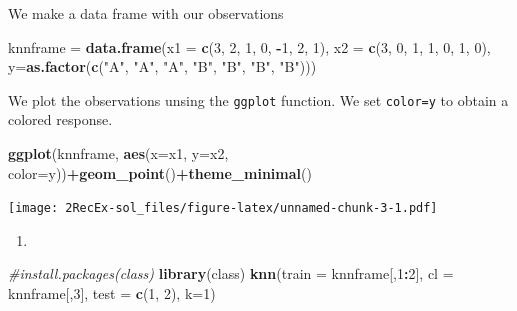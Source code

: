 \documentclass[]{article}
\newenvironment{Shaded}{\begin{snugshade}}{\end{snugshade}}
\newcommand{\KeywordTok}[1]{\textcolor[rgb]{0.13,0.29,0.53}{\textbf{#1}}}
\newcommand{\DataTypeTok}[1]{\textcolor[rgb]{0.13,0.29,0.53}{#1}}
\newcommand{\DecValTok}[1]{\textcolor[rgb]{0.00,0.00,0.81}{#1}}
\newcommand{\StringTok}[1]{\textcolor[rgb]{0.31,0.60,0.02}{#1}}
\newcommand{\CommentTok}[1]{\textcolor[rgb]{0.56,0.35,0.01}{\textit{#1}}}
\newcommand{\OperatorTok}[1]{\textcolor[rgb]{0.81,0.36,0.00}{\textbf{#1}}}
\newcommand{\NormalTok}[1]{#1}
\begin{document}
We make a data frame with our observations

\begin{Shaded}
\begin{Highlighting}[]
\NormalTok{knnframe =}\StringTok{ }\KeywordTok{data.frame}\NormalTok{(}\DataTypeTok{x1 =} \KeywordTok{c}\NormalTok{(}\DecValTok{3}\NormalTok{, }\DecValTok{2}\NormalTok{, }\DecValTok{1}\NormalTok{, }\DecValTok{0}\NormalTok{, }\OperatorTok{-}\DecValTok{1}\NormalTok{, }\DecValTok{2}\NormalTok{, }\DecValTok{1}\NormalTok{), }\DataTypeTok{x2 =} \KeywordTok{c}\NormalTok{(}\DecValTok{3}\NormalTok{, }\DecValTok{0}\NormalTok{, }\DecValTok{1}\NormalTok{, }\DecValTok{1}\NormalTok{, }\DecValTok{0}\NormalTok{, }\DecValTok{1}\NormalTok{, }\DecValTok{0}\NormalTok{),  }\DataTypeTok{y=}\KeywordTok{as.factor}\NormalTok{(}\KeywordTok{c}\NormalTok{(}\StringTok{"A"}\NormalTok{, }\StringTok{"A"}\NormalTok{, }\StringTok{"A"}\NormalTok{, }\StringTok{"B"}\NormalTok{, }\StringTok{"B"}\NormalTok{, }\StringTok{"B"}\NormalTok{, }\StringTok{"B"}\NormalTok{)))}
\end{Highlighting}
\end{Shaded}

We plot the observations unsing the \texttt{ggplot} function. We set
\texttt{color=y} to obtain a colored response.

\begin{Shaded}
\begin{Highlighting}[]
\KeywordTok{ggplot}\NormalTok{(knnframe, }\KeywordTok{aes}\NormalTok{(}\DataTypeTok{x=}\NormalTok{x1, }\DataTypeTok{y=}\NormalTok{x2, }\DataTypeTok{color=}\NormalTok{y))}\OperatorTok{+}\KeywordTok{geom_point}\NormalTok{()}\OperatorTok{+}\KeywordTok{theme_minimal}\NormalTok{()}
\end{Highlighting}
\end{Shaded}

\texttt{[image: 2RecEx-sol\_files/figure-latex/unnamed-chunk-3-1.pdf]}

\begin{enumerate}
\def\labelenumi{\alph{enumi}.}
\setcounter{enumi}{5}
\item
\end{enumerate}

\begin{Shaded}
\begin{Highlighting}[]
\CommentTok{#install.packages(class)}
\KeywordTok{library}\NormalTok{(class)}
\KeywordTok{knn}\NormalTok{(}\DataTypeTok{train =}\NormalTok{ knnframe[,}\DecValTok{1}\OperatorTok{:}\DecValTok{2}\NormalTok{], }\DataTypeTok{cl =}\NormalTok{ knnframe[,}\DecValTok{3}\NormalTok{], }\DataTypeTok{test =} \KeywordTok{c}\NormalTok{(}\DecValTok{1}\NormalTok{, }\DecValTok{2}\NormalTok{), }\DataTypeTok{k=}\DecValTok{1}\NormalTok{)}
\end{Highlighting}
\end{Shaded}
\end{document}
